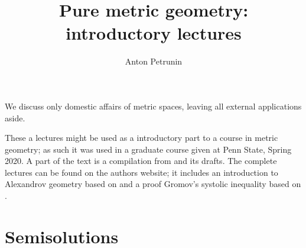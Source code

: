 \documentclass[twoside]{book}
\begin{document}
 
\title{Pure metric geometry:\\
introductory lectures}
\author{Anton Petrunin}
\date{}
\maketitle

We discuss only domestic affairs of metric spaces, leaving all  	external applications aside.

These a lectures might be used as a introductory part to a course in metric geometry;
as such it was used in a graduate course given at Penn State, Spring 2020.
A part of the text is a compilation from \cite{alexander-kapovitch-petrunin-2019, alexander-kapovitch-petrunin-2025, petrunin-yashinski, petrunin-2009, petrunin-zamorabarrera} and its drafts.
The complete lectures can be found on the authors website;
it includes an introduction to Alexandrov geometry based on \cite{alexander-kapovitch-petrunin-2019} and a proof Gromov's systolic inequality based on \cite{nabutovsky}.

\thispagestyle{empty}
\tableofcontents
\thispagestyle{empty}





%


\appendix
\chapter{Semisolutions}






{\small\sloppy


\printbibliography[heading=bibintoc]
\fussy
}
\end{document}
